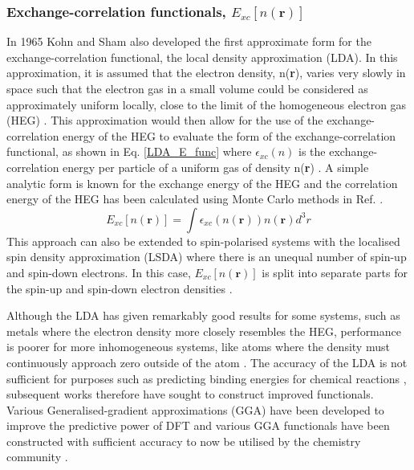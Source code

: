 \documentclass[11pt, twoside]{report}
\begin{document}



\subsubsection{Exchange-correlation functionals, $E_{xc}[n(\textbf{r})]$}
In 1965 Kohn and Sham also developed the first approximate form for the exchange-correlation functional, the local density approximation (LDA). In this approximation, it is assumed that the electron density, n(\textbf{r}), varies very slowly in space such that the electron gas in a small volume could be considered as approximately uniform locally, close to the limit of the homogeneous electron gas (HEG) \cite{RichardMartin_Ch8}. This approximation would then allow for the use of the exchange-correlation energy of the HEG to evaluate the form of the exchange-correlation functional, as shown in Eq. \ref{LDA_E_func} where $\epsilon_{xc}(n)$ is the exchange-correlation energy per particle of a uniform gas of density n(\textbf{r}) \cite{Prasad_ch3}. A simple analytic form is known for the exchange energy of the HEG and the correlation energy of the HEG has been calculated using Monte Carlo methods in Ref.  \cite{RichardMartin_Ch8}.
\begin{equation}\label{LDA_E_func}
E_{xc}[n(\mathbf{r})] = \int \epsilon_{xc}(n(\mathbf{r}))n(\mathbf{r})d^3r
\end{equation}
This approach can also be extended to spin-polarised systems with the localised spin density approximation (LSDA) where there is an unequal number of spin-up and spin-down electrons. In this case, $E_{xc}[n(\mathbf{r})]$ is split into separate parts for the spin-up and spin-down electron densities \cite{Prasad_ch3}.

Although the LDA has given remarkably good results for some systems, such as metals where the electron density more closely resembles the HEG, performance is poorer for more inhomogeneous systems, like atoms where the density must continuously approach zero outside of the atom \cite{RichardMartin_Ch8}. The accuracy of the LDA is not sufficient for purposes such as predicting binding energies for chemical reactions \cite{Prasad_ch3}, subsequent works therefore have sought to construct improved functionals. Various Generalised-gradient approximations (GGA) have been developed to improve the predictive power of DFT and various GGA functionals have been constructed with sufficient accuracy to now be utilised by the chemistry community \cite{RichardMartin_Ch8}.
\end{document}

